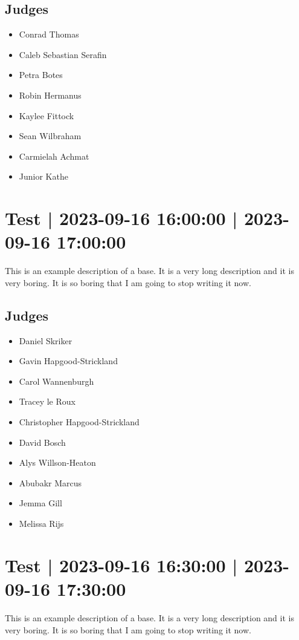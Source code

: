 \documentclass[10pt]{article}
\begin{document}
	\subsection*{Judges}
	\begin{itemize}

			\item Conrad Thomas
			\item Caleb Sebastian Serafin
			\item Petra Botes
			\item Robin Hermanus
			\item Kaylee Fittock
			\item Sean Wilbraham
			\item Carmielah Achmat
			\item Junior Kathe
		\end{itemize}

			\setcounter{section}{14}
	\section{Test | 2023-09-16 16:00:00 | 2023-09-16 17:00:00}
	This is an example description of a base. It is a very long description and it is very boring. It is so boring that I am going to stop writing it now.

	\subsection*{Judges}
	\begin{itemize}

			\item Daniel Skriker
			\item Gavin Hapgood-Strickland
			\item Carol Wannenburgh
			\item Tracey le Roux
			\item Christopher Hapgood-Strickland
			\item David Bosch
			\item Alys Willson-Heaton
			\item Abubakr Marcus
			\item Jemma Gill
			\item Melissa Rijs
		\end{itemize}

			\setcounter{section}{15}
	\section{Test | 2023-09-16 16:30:00 | 2023-09-16 17:30:00}
	This is an example description of a base. It is a very long description and it is very boring. It is so boring that I am going to stop writing it now.
\end{document}
